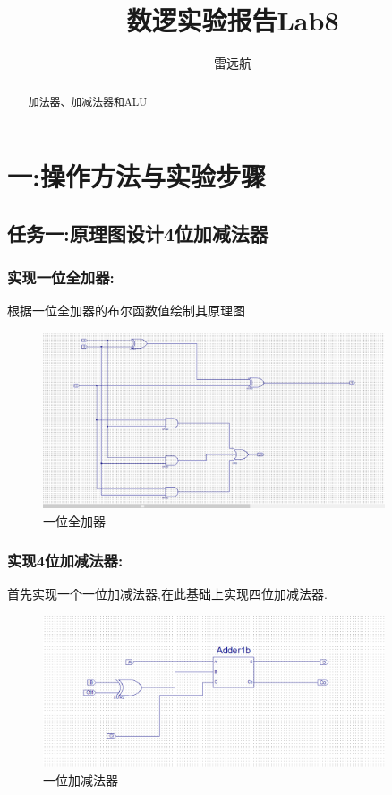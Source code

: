 \documentclass{article}
\title{数逻实验报告Lab8}
\author{雷远航}
\begin{document}
    
\maketitle

\begin{abstract}
    加法器、加减法器和ALU 
\end{abstract}

\section*{一:操作方法与实验步骤}

\subsection*{任务一:原理图设计4位加减法器}

\subsubsection*{实现一位全加器:}
根据一位全加器的布尔函数值绘制其原理图
\begin{figure}[H]
    \centering
    \includegraphics[width=0.9\textwidth]{lab8/1.png}
    \caption{\label{Lab8}一位全加器}
    \end{figure}

\subsubsection*{实现4位加减法器:}
首先实现一个一位加减法器,在此基础上实现四位加减法器.
\begin{figure}[H]
    \centering
    \includegraphics[width=0.9\textwidth]{lab8/2.png}
    \caption{\label{Lab8}一位加减法器}
    \end{figure}
\end{document}
